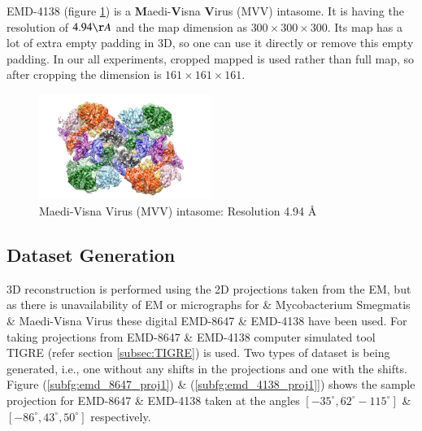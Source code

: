 \documentclass[twoside]{iitbreport}
\begin{document}
EMD-4138 (figure \ref{fig:EMD-4138-3d-struct}) is a \textbf{M}aedi-\textbf{V}isna \textbf{V}irus (MVV) intasome. It is having the resolution of $4.94\AA$ and the map dimension as $300\times300\times300$. Its map has a lot of extra empty padding in 3D, so one can use it directly or remove this empty padding. In our all experiments, cropped mapped is used rather than full map, so after cropping the dimension is $161\times161\times161$. 

\begin{figure}[H]
\includegraphics[width=0.5\textwidth]{Emd_4138.png}
\centering
\captionsetup{justification=centering}
\caption{Maedi-Visna Virus (MVV) intasome: Resolution 4.94 \AA }
\label{fig:EMD-4138-3d-struct}
\end{figure}

\subsection{Dataset Generation}

3D reconstruction is performed using the 2D projections taken from the EM, but as there is unavailability of EM or micrographs for  \& Mycobacterium Smegmatis \& Maedi-Visna Virus these digital EMD-8647 \& EMD-4138 have been used. For taking projections from EMD-8647 \& EMD-4138 computer simulated tool TIGRE (refer section \ref{subsec:TIGRE}) is used. Two types of dataset is being generated, i.e., one without any shifts in the projections and one with the shifts. Figure (\ref{subfg:emd_8647_proj1}) \& (\ref{subfg:emd_4138_proj1}]) shows the sample projection for  EMD-8647 \& EMD-4138 taken at the angles $[-35^{\circ} ,62^{\circ} -115^{\circ}]$ \& $[-86^{\circ},43^{\circ},50^{\circ}]$ respectively.  
\end{document}
